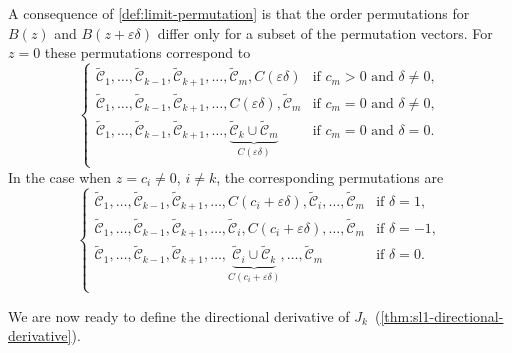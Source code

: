 \begin{remark}
  A consequence of \cref{def:limit-permutation} is that the order
  permutations for \(B(z)\) and \(B(z + \varepsilon \delta)\) differ only for a subset of
  the permutation vectors. For \(z = 0\)
  these permutations correspond to
  \[
    \begin{cases}
      \tilde{\mathcal{C}}_1, \dots, \tilde{\mathcal{C}}_{k-1}, \tilde{\mathcal{C}}_{k+1}, \dots, \tilde{\mathcal{C}}_m, C(\varepsilon\delta)                                          & \text{if } c_m > 0 \text{ and } \delta \neq 0, \\
      \tilde{\mathcal{C}}_1, \dots, \tilde{\mathcal{C}}_{k-1}, \tilde{\mathcal{C}}_{k+1}, \dots, C(\varepsilon\delta), \tilde{\mathcal{C}}_m                                          & \text{if } c_m = 0 \text{ and } \delta \neq 0, \\
      \tilde{\mathcal{C}}_1, \dots, \tilde{\mathcal{C}}_{k-1}, \tilde{\mathcal{C}}_{k+1}, \dots, \underbrace{\tilde{\mathcal{C}}_k \cup \tilde{\mathcal{C}}_m}_{C(\varepsilon\delta)} & \text{if } c_m = 0 \text{ and } \delta = 0.    \\
    \end{cases}
  \]
  In the case when \(z = c_i \neq 0\), \(i \neq k\), the corresponding permutations are
  \[
    \begin{cases}
      \tilde{\mathcal{C}}_1, \dots, \tilde{\mathcal{C}}_{k-1}, \tilde{\mathcal{C}}_{k+1}, \dots, C(c_i + \varepsilon\delta), \tilde{\mathcal{C}}_i, \dots, \tilde{\mathcal{C}}_m                                          & \text{if } \delta = 1,  \\
      \tilde{\mathcal{C}}_1, \dots, \tilde{\mathcal{C}}_{k-1}, \tilde{\mathcal{C}}_{k+1}, \dots, \tilde{\mathcal{C}}_i, C(c_i + \varepsilon\delta), \dots, \tilde{\mathcal{C}}_m                                          & \text{if } \delta = -1, \\
      \tilde{\mathcal{C}}_1, \dots, \tilde{\mathcal{C}}_{k-1}, \tilde{\mathcal{C}}_{k+1}, \dots, \underbrace{\tilde{\mathcal{C}}_i \cup \tilde{\mathcal{C}}_k}_{C(c_i + \varepsilon\delta)}, \dots, \tilde{\mathcal{C}}_m & \text{if } \delta = 0.  \\
    \end{cases}
  \]
\end{remark}

We are now ready to define the directional derivative of \(J_k\)~(\cref{thm:sl1-directional-derivative}).

